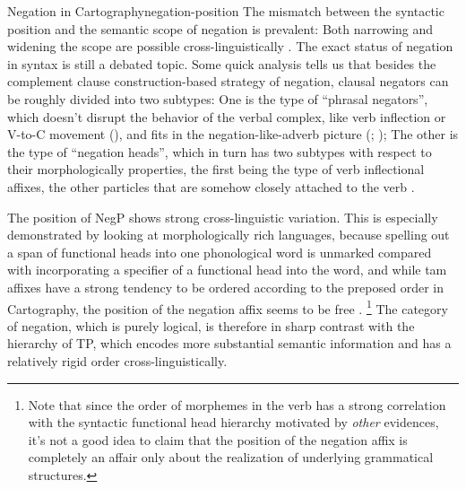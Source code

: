 \documentclass[UTF8, a4paper, oneside, scheme=plain]{ctexrep}
\newcommand*{\citesec}[1]{\S~{#1}}
\newcommand*{\citepage}[1]{pp.~{#1}}
\begin{document}
\begin{theorybox}{Negation in Cartography}{negation-position}
    The mismatch between the syntactic position and the semantic scope of negation 
    is prevalent: Both narrowing and widening the scope are possible cross-linguistically
    \cite[\citepage{40}]{moscati2010negation}.
    The exact status of negation in syntax is still a debated topic.
    Some quick analysis tells us that besides 
    the complement clause construction-based strategy of negation,
    clausal negators can be roughly divided into two subtypes:
    One is the type of ``phrasal negators'',
    which doesn't disrupt the behavior of the verbal complex,
    like verb inflection or V-to-C movement (),
    and fits in the negation-like-adverb picture 
    (\citealt[\citepage{101}]{zanuttini1997negation};
    \citealt[\citesec{4.7}]{radford2009analysing});
    The other is the type of ``negation heads'',
    which in turn has two subtypes with respect to their morphologically properties,
    the first being the type of verb inflectional affixes,
    the other particles that are somehow closely attached to the verb \citep{zeijlstra2013}.    

    The position of NegP shows strong cross-linguistic variation.
    This is especially demonstrated by looking at morphologically rich languages,
    because spelling out a span of functional heads into one phonological word
    is unmarked compared with incorporating a specifier of a functional head 
    into the word,
    and while \acs{tam} affixes have a strong tendency to be ordered 
    according to the preposed order in Cartography, 
    the position of the negation affix seems to be free \citep[\citepage{15}]{moscati2010negation}.%
    \footnote{
        Note that since the order of morphemes in the verb has a strong correlation 
        with the syntactic functional head hierarchy motivated by \emph{other} evidences,
        it's not a good idea to claim that the position of the negation affix 
        is completely an affair only about the realization of underlying grammatical structures.
    }
    The category of negation, which is purely logical, is therefore in sharp contrast with 
    the hierarchy of TP, 
    which encodes more substantial semantic information
    and has a relatively rigid order cross-linguistically.


\end{theorybox}
\end{document}

